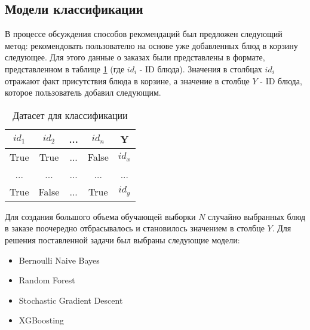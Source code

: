 \subsection{Модели классификации}
В процессе обсуждения способов рекомендаций был предложен следующий метод: рекомендовать
пользователю на основе уже добавленных блюд в корзину следующее. Для этого данные о заказах были
представлены в формате, представленном в таблице \ref{table:1} (где $id_i$ - ID блюда).
Значения в столбцах $id_i$ отражают факт присутствия блюда в корзине, а значение в
столбце $Y$ - ID блюда, которое пользователь добавил следующим.
\begin{table}[H]
  \centering
  \begin{tabular} { | c | c | c | c | c | }
  \hline
  $id_1$ & $id_2$ & ... & $id_n$ & Y \\
  \hline
  True  & True  & ... & False & $id_x$ \\
  \hline
  ...  & ...  & ... & ... & ... \\
  \hline
  True  & False  & ... & True & $id_y$ \\
  \hline
  \end{tabular}
  \caption{Датасет для классификации}
  \label{table:1}
\end{table}
Для создания большого объема обучающей выборки $N$ случайно выбранных блюд в заказе
поочередно отбрасывалось и становилось значением в столбце $Y$. Для решения поставленной
задачи был выбраны следующие модели:
\begin{itemize}
  \item Bernoulli Naive Bayes \cite{BernoulliNB}
  \item Random Forest \cite{RandomForest}
  \item Stochastic Gradient Descent \cite{SGD}
  \item XGBoosting \cite{XGBoosting}
\end{itemize}
